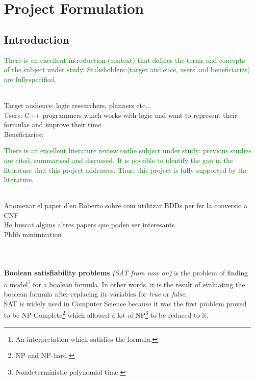 
\chapter{Project Formulation} %

\label{Chapter1} %

\section{Introduction}
\textcolor{green}{
	There is an excellent introduction
	(context) that defines the terms
	and concepts of the subject under
	study. Stakeholders (target
	audience, users and beneficiaries)
	are fullyspecified.
	\\
	\\}

Target audience: logic researchers, planners etc...\\
Users: C++ programmers which works with logic and want to represent their formulas and improve their time\\
Beneficiaries:

\textcolor{green}{There is an excellent literature
	review onthe subject under study:
	previous studies are cited,
	summarised and discussed.
	It is possible to identify the gap in
	the literature that this project
	addresses. Thus, this project is
	fully supported by the literature.
	\\
	\\}

Anomenar el paper d'en Roberto sobre com utilitzar BDDs per fer la conversio a CNF\\
He buscat alguns altres papers que poden ser interesants\\
Pblib minimization\\
\\
\\
\\


\textbf{Boolean satisfiability problems} \textit{(SAT from now on)} is the problem of finding a model\footnote{An interpretation which satisfies the formula.} for a boolean formula. In other words, it is the result of evaluating the boolean formula after replacing its variables for \emph{true} or \emph{false}. 
\\
SAT is widely used in Computer Science because it was the first problem proved to be NP-Complete\cite{Cook1971}\footnote{NP and NP-hard.} which allowed a lot of NP\footnote{Nondeterministic polynomial time.} to be reduced to it.

